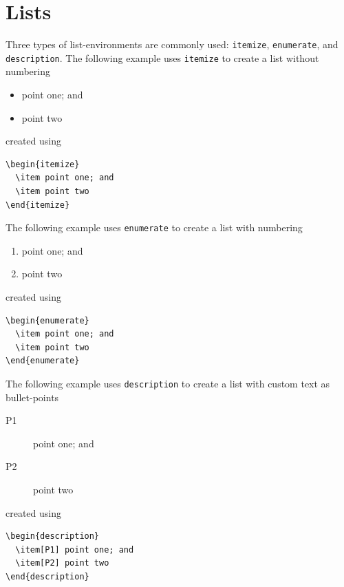 \section{Lists}\label{sec:lists}
Three types of list-environments are commonly used: \texttt{itemize}, \texttt{enumerate}, and \texttt{description}. The following example uses \texttt{itemize} to create a list without numbering
\begin{itemize}
  \item point one; and
  \item point two
\end{itemize}
created using
\begin{verbatim}
\begin{itemize}
  \item point one; and
  \item point two
\end{itemize}
\end{verbatim}

The following example uses \texttt{enumerate} to create a list with numbering
\begin{enumerate}
  \item point one; and
  \item point two
\end{enumerate}
created using
\begin{verbatim}
\begin{enumerate}
  \item point one; and
  \item point two
\end{enumerate}
\end{verbatim}

The following example uses \texttt{description} to create a list with custom text as bullet-points
\begin{description}
  \item[P1] point one; and
  \item[P2] point two
\end{description}
created using
\begin{verbatim}
\begin{description}
  \item[P1] point one; and
  \item[P2] point two
\end{description}
\end{verbatim}


